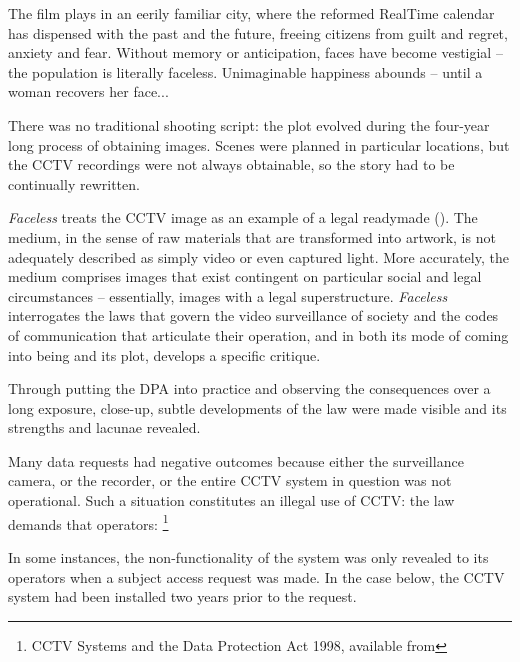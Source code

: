 {The film plays in an eerily familiar city, where the reformed RealTime
calendar has dispensed with the past and the future, freeing citizens
from guilt and regret, anxiety and fear. Without memory or
anticipation, faces have become vestigial {--} the population is
literally faceless. Unimaginable happiness abounds {--} until a woman
recovers her face...

There was no traditional shooting script: the plot evolved during the
four{}-year long process of obtaining images. Scenes were planned in
particular locations, but the CCTV recordings were not always
obtainable, so the story had to be continually rewritten.

{\em Faceless} treats the CCTV image as an example of a legal
readymade (). The medium, in the sense of raw
materials that are transformed into artwork, is not adequately
described as simply video or even captured light. More accurately, the
medium comprises images that exist contingent on particular social and
legal circumstances {--} essentially, images with a legal
superstructure. {\em Faceless} interrogates the laws that govern the
video surveillance of society and the codes of communication that
articulate their operation, and in both its mode of coming into being
and its plot, develops a specific critique.


Through putting the DPA into practice and observing the consequences
over a long exposure, close{}-up, subtle developments of the law were
made visible and its strengths and lacunae revealed.


Many data requests had negative outcomes because either the surveillance
camera, or the recorder, or the entire CCTV system in question was not
operational. Such a situation constitutes an illegal use of CCTV: the
law demands that operators:  \footnote{CCTV Systems and the Data Protection Act 1998, available from }

In some instances, the non{}-functionality of the system was only
revealed to its operators when a subject access request was made. In
the case below, the CCTV system had been installed two years prior to
the request.

}
